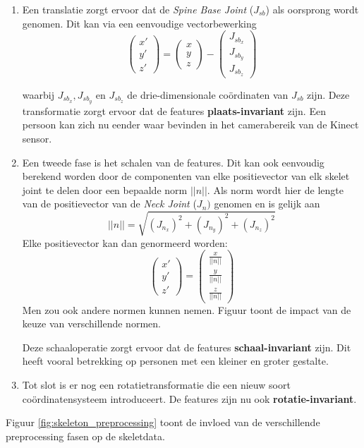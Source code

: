 \begin{enumerate}
	\item Een translatie zorgt ervoor dat de \textit{Spine Base Joint} ($J_{sb}$) als oorsprong wordt genomen. Dit kan via een eenvoudige vectorbewerking 
	$$\begin{pmatrix}
	x' \\ y' \\ z'
	\end{pmatrix}
	= \begin{pmatrix}
	x \\ y \\ z
	\end{pmatrix}
	- \begin{pmatrix}
	J_{sb_{x}} \\ J_{sb_{y}}\\ J_{sb_{z}}
	\end{pmatrix}$$
	
	waarbij $J_{sb_{x}}, J_{sb_{y}}$ en $J_{sb_{z}}$ de drie-dimensionale coördinaten van $J_{sb}$ zijn. Deze transformatie zorgt ervoor dat de features \textbf{plaats-invariant} zijn. Een persoon kan zich nu eender waar bevinden in het camerabereik van de Kinect sensor.
	\item Een tweede fase is het schalen van de features. Dit kan ook eenvoudig berekend worden door de componenten van elke positievector van elk skelet joint te delen door een bepaalde norm $||n||$. Als norm wordt hier de lengte van de positievector van de \textit{Neck Joint} ($J_n)$ genomen en is gelijk aan
	$$||n|| = \sqrt{(J_{n_x})^2 + (J_{n_y})^2 + (J_{n_z})^2}$$
	Elke positievector kan dan genormeerd worden:
	$$
	\begin{pmatrix}
	x' \\ y' \\ z'
	\end{pmatrix}
	=				
	\begin{pmatrix}
	\frac{x}{||n||} \\ \frac{y}{||n||}  \\ \frac{z}{||n||} 
	\end{pmatrix}$$
	Men zou ook andere normen kunnen nemen. Figuur  toont de impact van de keuze van verschillende normen.
	
	Deze schaaloperatie zorgt ervoor dat de features \textbf{schaal-invariant} zijn. Dit heeft vooral betrekking op personen met een kleiner en groter gestalte.
	\item Tot slot is er nog een rotatietransformatie die een nieuw soort coördinatensysteem introduceert. De features zijn nu ook \textbf{rotatie-invariant}.
\end{enumerate}
Figuur \ref{fig:skeleton_preprocessing} toont de invloed van de verschillende preprocessing fasen op de skeletdata.

